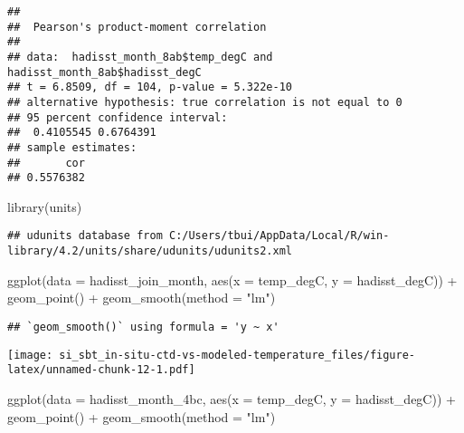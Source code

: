 \documentclass[
]{article}
\newenvironment{Shaded}{\begin{snugshade}}{\end{snugshade}}
\newcommand{\AttributeTok}[1]{\textcolor[rgb]{0.77,0.63,0.00}{#1}}
\newcommand{\CommentTok}[1]{\textcolor[rgb]{0.56,0.35,0.01}{\textit{#1}}}
\newcommand{\FunctionTok}[1]{\textcolor[rgb]{0.00,0.00,0.00}{#1}}
\newcommand{\NormalTok}[1]{#1}
\newcommand{\SpecialCharTok}[1]{\textcolor[rgb]{0.00,0.00,0.00}{#1}}
\newcommand{\StringTok}[1]{\textcolor[rgb]{0.31,0.60,0.02}{#1}}
\begin{document}
\begin{Shaded}
\end{Shaded}

\begin{verbatim}
## 
##  Pearson's product-moment correlation
## 
## data:  hadisst_month_8ab$temp_degC and hadisst_month_8ab$hadisst_degC
## t = 6.8509, df = 104, p-value = 5.322e-10
## alternative hypothesis: true correlation is not equal to 0
## 95 percent confidence interval:
##  0.4105545 0.6764391
## sample estimates:
##       cor 
## 0.5576382
\end{verbatim}

\begin{Shaded}
\begin{Highlighting}[]
\FunctionTok{library}\NormalTok{(units)}
\end{Highlighting}
\end{Shaded}

\begin{verbatim}
## udunits database from C:/Users/tbui/AppData/Local/R/win-library/4.2/units/share/udunits/udunits2.xml
\end{verbatim}

\begin{Shaded}
\begin{Highlighting}[]
\FunctionTok{ggplot}\NormalTok{(}\AttributeTok{data =}\NormalTok{ hadisst\_join\_month, }\FunctionTok{aes}\NormalTok{(}\AttributeTok{x =}\NormalTok{ temp\_degC, }\AttributeTok{y =}\NormalTok{ hadisst\_degC)) }\SpecialCharTok{+} \FunctionTok{geom\_point}\NormalTok{() }\SpecialCharTok{+} \FunctionTok{geom\_smooth}\NormalTok{(}\AttributeTok{method =} \StringTok{"lm"}\NormalTok{)}
\end{Highlighting}
\end{Shaded}

\begin{verbatim}
## `geom_smooth()` using formula = 'y ~ x'
\end{verbatim}

\texttt{[image: si\_sbt\_in-situ-ctd-vs-modeled-temperature\_files/figure-latex/unnamed-chunk-12-1.pdf]}

\begin{Shaded}
\begin{Highlighting}[]
\FunctionTok{ggplot}\NormalTok{(}\AttributeTok{data =}\NormalTok{ hadisst\_month\_4bc, }\FunctionTok{aes}\NormalTok{(}\AttributeTok{x =}\NormalTok{ temp\_degC, }\AttributeTok{y =}\NormalTok{ hadisst\_degC)) }\SpecialCharTok{+} \FunctionTok{geom\_point}\NormalTok{() }\SpecialCharTok{+} \FunctionTok{geom\_smooth}\NormalTok{(}\AttributeTok{method =} \StringTok{"lm"}\NormalTok{)}
\end{Highlighting}
\end{Shaded}
\end{document}
